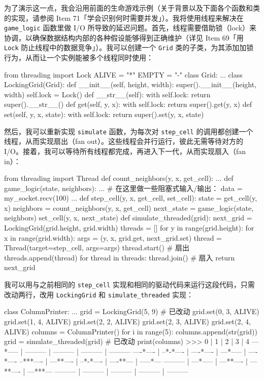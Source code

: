 为了演示这一点，我会沿用前面的生命游戏示例（关于背景以及下面各个函数和类的实现，请参阅 Item 71「学会识别何时需要并发」）。我将使用线程来解决在 \texttt{game\_logic} 函数里做 I/O 所导致的延迟问题。首先，线程需要借助锁（lock）来协调，以确保数据结构内部的各种假设能够得到正确维护（详见 Item 69「用 \texttt{Lock} 防止线程中的数据竞争」）。我可以创建一个 \texttt{Grid} 类的子类，为其添加加锁行为，从而让一个实例能被多个线程同时使用：

\begin{codebox}[python]
from threading import Lock
ALIVE = "*"
EMPTY = "-"
class Grid:
    ...
class LockingGrid(Grid):
    def __init__(self, height, width):
        super().__init__(height, width)
        self.lock = Lock()
    def __str__(self):
        with self.lock:
            return super().__str__()
    def get(self, y, x):
        with self.lock:
            return super().get(y, x)
    def set(self, y, x, state):
        with self.lock:
            return super().set(y, x, state)
\end{codebox}

然后，我可以重新实现 \texttt{simulate} 函数，为每次对 \texttt{step\_cell} 的调用都创建一个线程，从而实现扇出（fan out）。这些线程会并行运行，彼此无需等待对方的 I/O。接着，我可以等待所有线程都完成，再进入下一代，从而实现扇入（fan in）：

\begin{codebox}[python]
from threading import Thread
def count_neighbors(y, x, get_cell):
    ...
def game_logic(state, neighbors):
    ...
    # 在这里做一些阻塞式输入/输出：
    data = my_socket.recv(100)
    ...
def step_cell(y, x, get_cell, set_cell):
    state = get_cell(y, x)
    neighbors = count_neighbors(y, x, get_cell)
    next_state = game_logic(state, neighbors)
    set_cell(y, x, next_state)
def simulate_threaded(grid):
    next_grid = LockingGrid(grid.height, grid.width)
    threads = []
    for y in range(grid.height):
        for x in range(grid.width):
            args = (y, x, grid.get, next_grid.set)
            thread = Thread(target=step_cell, args=args)
            thread.start()  # 扇出
            threads.append(thread)
    for thread in threads:
        thread.join()  # 扇入
    return next_grid
\end{codebox}

我可以用与之前相同的 \texttt{step\_cell} 实现和相同的驱动代码来运行这段代码，只需改动两行，改用 \texttt{LockingGrid} 和 \texttt{simulate\_threaded} 实现：

\begin{codebox}[python]
class ColumnPrinter:
    ...
grid = LockingGrid(5, 9)  # 已改动
grid.set(0, 3, ALIVE)
grid.set(1, 4, ALIVE)
grid.set(2, 2, ALIVE)
grid.set(2, 3, ALIVE)
grid.set(2, 4, ALIVE)
columns = ColumnPrinter()
for i in range(5):
    columns.append(str(grid))
    grid = simulate_threaded(grid)  # 已改动
print(columns)
>>>
    0     |     1     |     2     |     3     |     4
---*----- | --------- | --------- | --------- | ---------
----*---- | --*-*---- | ----*---- | ---*----- | ----*----
--***---- | ---**---- | --*-*---- | ----**--- | -----*---
--------- | ---*----- | ---**---- | ---**---- | ---***---
--------- | --------- | --------- | --------- | ---------
\end{codebox}

